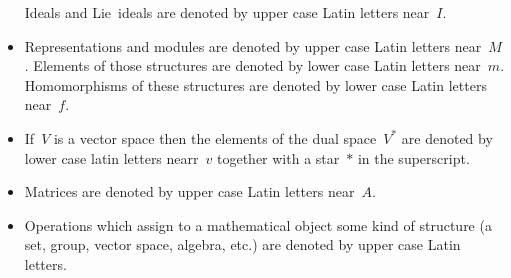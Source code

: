 \begin{itemize}
    Ideals and Lie~ideals are denoted by upper case Latin letters near~$I$.
  \item
    Representations and modules are denoted by upper case Latin letters near~$M$.
    Elements of those structures are denoted by lower case Latin letters near~$m$.
    Homomorphisms of these structures are denoted by lower case Latin letters near~$f$.
  \item
    If~$V$ is a vector space then the elements of the dual space~$V^*$ are denoted by lower case latin letters nearr~$v$ together with a star~$*$ in the superscript.
  \item
    Matrices are denoted by upper case Latin letters near~$A$.
  \item
    Operations which assign to a mathematical object some kind of structure (a set, group, vector space, algebra, etc.) are denoted by upper case Latin letters.
\end{itemize}
